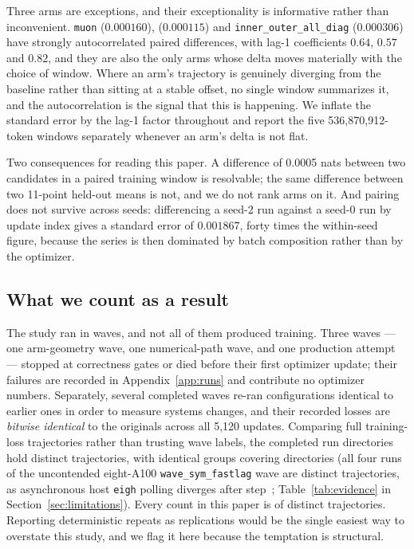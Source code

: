 Three arms are exceptions, and their exceptionality is informative rather than
inconvenient. \texttt{muon} ($0.000160$), \leftall{} ($0.000115$) and
\texttt{inner\_outer\_all\_diag} ($0.000306$) have strongly autocorrelated
paired differences, with lag-1 coefficients $0.64$, $0.57$ and $0.82$, and they
are also the only arms whose delta moves materially with the choice of window.
Where an arm's trajectory is genuinely diverging from the baseline rather than
sitting at a stable offset, no single window summarizes it, and the
autocorrelation is the signal that this is happening. We inflate the standard
error by the lag-1 factor throughout and report the five 536{,}870{,}912-token
windows separately whenever an arm's delta is not flat.

Two consequences for reading this paper. A difference of 0.0005 nats between
two candidates in a paired training window is resolvable; the same difference
between two 11-point held-out means is not, and we do not rank arms on it.
And pairing does not survive across seeds: differencing a seed-2 run against a
seed-0 run by update index gives a standard error of $0.001867$, forty times the
within-seed figure, because the series is then dominated by batch composition
rather than by the optimizer.

\subsection{What we count as a result}

The study ran in waves, and not all of them produced training. Three waves ---
one arm-geometry wave, one numerical-path wave, and one production attempt ---
stopped at correctness gates or died before their first optimizer update; their
failures are recorded in Appendix~\ref{app:runs} and contribute no optimizer
numbers. Separately, several completed waves re-ran configurations
identical to earlier ones in order to measure systems changes, and their
recorded losses are \emph{bitwise identical} to the originals across all
5{,}120 updates. Comparing full training-loss trajectories rather than trusting
wave labels, the \nRunDirs{} completed run directories hold \nDistinctRuns{}
distinct trajectories, with \nDuplicateGroups{} identical groups covering
\nDuplicateDirs{} directories (all four runs of the uncontended eight-A100
\texttt{wave\_sym\_fastlag} wave are distinct trajectories, as asynchronous host
\texttt{eigh} polling diverges after step~\symWaveExactSteps{};
Table~\ref{tab:evidence} in Section~\ref{sec:limitations}). Every count in this
paper is of distinct trajectories. Reporting deterministic repeats as
replications would be the single easiest way to overstate this study, and we
flag it here because the temptation is structural.
